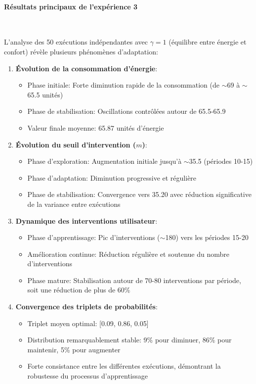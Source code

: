 \paragraph{Résultats principaux de l'expérience 3}\

L'analyse des 50 exécutions indépendantes avec $\gamma=1$ (équilibre entre énergie et confort) révèle plusieurs phénomènes d'adaptation:

\begin{enumerate}
    \item \textbf{Évolution de la consommation d'énergie}:
    \begin{itemize}
        \item Phase initiale: Forte diminution rapide de la consommation (de $\sim$69 à $\sim$65.5 unités)
        \item Phase de stabilisation: Oscillations contrôlées autour de 65.5-65.9
        \item Valeur finale moyenne: 65.87 unités d'énergie
    \end{itemize}
    
    \item \textbf{Évolution du seuil d'intervention ($m$)}:
    \begin{itemize}
        \item Phase d'exploration: Augmentation initiale jusqu'à $\sim$35.5 (périodes 10-15)
        \item Phase d'adaptation: Diminution progressive et régulière
        \item Phase de stabilisation: Convergence vers 35.20 avec réduction significative de la variance entre exécutions
    \end{itemize}
    
    \item \textbf{Dynamique des interventions utilisateur}:
    \begin{itemize}
        \item Phase d'apprentissage: Pic d'interventions ($\sim$180) vers les périodes 15-20
        \item Amélioration continue: Réduction régulière et soutenue du nombre d'interventions
        \item Phase mature: Stabilisation autour de 70-80 interventions par période, soit une réduction de plus de 60\% 
    \end{itemize}
    
    \item \textbf{Convergence des triplets de probabilités}:
    \begin{itemize}
        \item Triplet moyen optimal: [0.09, 0.86, 0.05]
        \item Distribution remarquablement stable: 9\% pour diminuer, 86\% pour maintenir, 5\% pour augmenter
        \item Forte consistance entre les différentes exécutions, démontrant la robustesse du processus d'apprentissage
    \end{itemize}
\end{enumerate}

